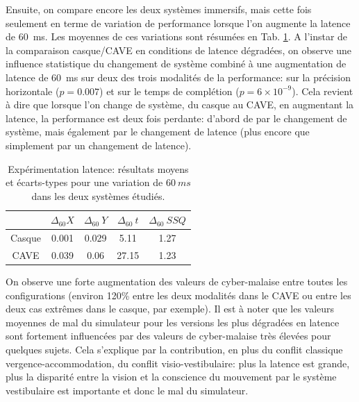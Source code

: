 	\par Ensuite, on compare encore les deux systèmes immersifs, mais cette fois seulement en terme de variation de performance lorsque l'on augmente la latence de 60~ms. Les moyennes de ces variations sont résumées en Tab. \ref{tab:resultats_delta_casque_cave}. A l'instar de la comparaison casque/CAVE en conditions de latence dégradées, on observe une influence statistique du changement de système combiné à une augmentation de latence de 60~ms sur deux des trois modalités de la performance: sur la précision horizontale ($p = 0.007$) et sur le temps de complétion ($p = 6 \times 10^{-9}$). Cela revient à dire que lorsque l'on change de système, du casque au CAVE, en augmentant la latence, la performance est deux fois perdante: d'abord de par le changement de système, mais également par le changement de latence (plus encore que simplement par un changement de latence).
	
	\begin{table}[h]	
		\centering
		\caption{Expérimentation latence: résultats moyens et écarts-types pour une variation de $60~ms$ dans les deux systèmes étudiés.}
		\label{tab:resultats_delta_casque_cave}
		\begin{tabular}{c|c|c|c|c}
			& $\Delta_{60}X$ & $\Delta_{60}~Y$ & $\Delta_{60}~t$ & $\Delta_{60}~SSQ$\\ \hline
			Casque & 0.001 & 0.029 & 5.11 & 1.27\\
			CAVE & 0.039 & 0.06 & 27.15 & 1.23\\
		\end{tabular}
	\end{table}
	
	\par On observe une forte augmentation des valeurs de cyber-malaise entre toutes les configurations (environ 120\% entre les deux modalités dans le CAVE ou entre les deux cas extrêmes dans le casque, par exemple). Il est à noter que les valeurs moyennes de mal du simulateur pour les versions les plus dégradées en latence sont fortement influencées par des valeurs de cyber-malaise très élevées pour quelques sujets. Cela s'explique par la contribution, en plus du conflit classique vergence-accommodation, du conflit visio-vestibulaire: plus la latence est grande, plus la disparité entre la vision et la conscience du mouvement par le système vestibulaire est importante et donc le mal du simulateur.	
	
